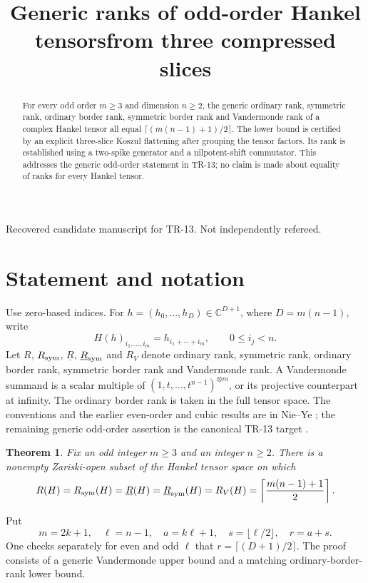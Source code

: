 \documentclass[11pt]{article}
\title{Generic ranks of odd-order Hankel tensors\newline from three compressed slices}
\author{}
\date{}
\newtheorem{theorem}{Theorem}
\newcommand{\C}{\mathbb C}
\newcommand{\brk}{\underline{R}}
\begin{document}
\maketitle
\begin{center}\small Recovered candidate manuscript for TR-13. Not independently refereed.\end{center}
\begin{abstract}
For every odd order $m\ge3$ and dimension $n\ge2$, the generic ordinary
rank, symmetric rank, ordinary border rank, symmetric border rank and
Vandermonde rank of a complex Hankel tensor all equal
$\lceil(m(n-1)+1)/2\rceil$. The lower bound is certified by an explicit
three-slice Koszul flattening after grouping the tensor factors. Its rank
is established using a two-spike generator and a nilpotent-shift
commutator. This addresses the generic odd-order statement in TR-13; no
claim is made about equality of ranks for every Hankel tensor.
\end{abstract}

\section{Statement and notation}
Use zero-based indices. For $h=(h_0,\ldots,h_D)\in\C^{D+1}$, where
$D=m(n-1)$, write
\[
 H(h)_{i_1,\ldots,i_m}=h_{i_1+\cdots+i_m},
 \qquad 0\le i_j<n.
\]
Let $R$, $R_{\rm sym}$, $\brk$, $\brk_{\rm sym}$ and $R_V$ denote ordinary
rank, symmetric rank, ordinary border rank, symmetric border rank and
Vandermonde rank. A Vandermonde summand is a scalar multiple of
$(1,t,\ldots,t^{n-1})^{\otimes m}$, or its projective counterpart at
infinity. The ordinary border rank is taken in the full tensor space.
The conventions and the earlier even-order and cubic results are in
Nie--Ye \cite{NY}; the remaining generic odd-order assertion is the
canonical TR-13 target \cite{repo}.

\begin{theorem}\label{thm:main}
Fix an odd integer $m\ge3$ and an integer $n\ge2$. There is a nonempty
Zariski-open subset of the Hankel tensor space on which
\[
 R(H)=R_{\rm sym}(H)=\brk(H)=\brk_{\rm sym}(H)=R_V(H)
 =\left\lceil\frac{m(n-1)+1}{2}\right\rceil.
\]
\end{theorem}
Put
\[
 m=2k+1,\quad \ell=n-1,\quad a=k\ell+1,\quad
 s=\lfloor\ell/2\rfloor,\quad r=a+s.
\]
One checks separately for even and odd $\ell$ that
$r=\lceil(D+1)/2\rceil$. The proof consists of a generic Vandermonde upper
bound and a matching ordinary-border-rank lower bound.
\end{document}

